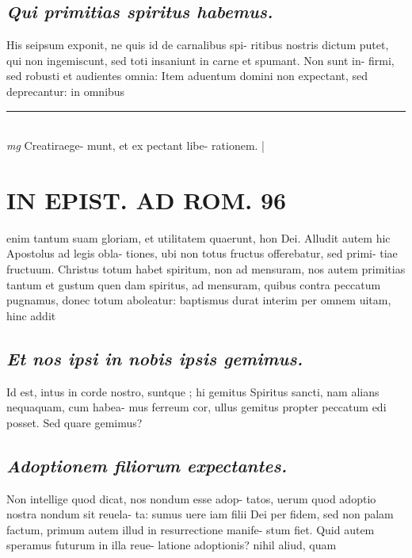 \documentclass{article}
\begin{document}
\begin{pages}
\subsection*{\textit{Qui primitias spiritus habemus. }}\pstart His seipsum exponit, ne quis id de carnalibus spi- ritibus nostris dictum putet, qui non ingemiscunt, sed toti insaniunt in carne et spumant. Non sunt in- firmi, sed robusti et audientes omnia: Item aduentum domini non expectant, sed deprecantur: in omnibus  \pend
\vspace{0.5cm}\noindent
\vspace{0.2cm}\rule{1cm}{0.2pt}\\ 
\hspace{0.2cm}\textit{mg}
\footnotesize Creatiraege- munt, et ex pectant libe- rationem.  
\normalsize| 
\section*{IN EPIST. AD ROM.  96 }
\marginpar{[ p.]}\pstart enim tantum suam gloriam, et utilitatem quaerunt, hon Dei. Alludit autem hic Apostolus ad legis obla- tiones, ubi non totus fructus offerebatur, sed primi- tiae fructuum. Christus totum habet spiritum, non ad mensuram, nos autem primitias tantum et gustum quen dam spiritus, ad mensuram, quibus contra peccatum pugnamus, donec totum aboleatur: baptismus durat interim per omnem uitam, hinc addit  \pend
{}
{}
\subsection*{\textit{Et nos ipsi in nobis ipsis gemimus. }}\pstart Id est, intus in corde nostro, suntque ; hi gemitus Spiritus sancti, nam alians nequaquam, cum habea- mus ferreum cor, ullus gemitus propter peccatum edi posset. Sed quare gemimus?  \pend
{}
{}
\subsection*{\textit{Adoptionem filiorum expectantes. }}\pstart Non intellige quod dicat, nos nondum esse adop- tatos, uerum quod adoptio nostra nondum sit reuela- ta: sumus uere iam filii Dei per fidem, sed non palam factum, primum autem illud in resurrectione manife- stum fiet. Quid autem speramus futurum in illa reue- latione adoptionis? nihil aliud, quam  \pend
{}
{}

\end{pages}
\end{document}

